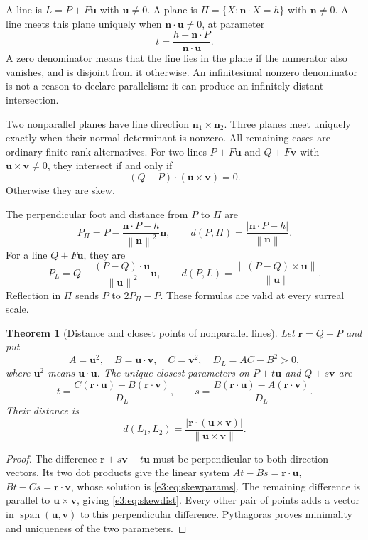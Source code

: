 \documentclass[11pt,letterpaper]{article}
\numberwithin{equation}{section}
\newtheorem{theorem}{Theorem}[section]
\theoremstyle{definition}
\theoremstyle{remark}
\newcommand{\Span}{\operatorname{span}}
\newcommand{\norm}[1]{\left\lVert#1\right\rVert}
\newcommand{\vv}[1]{\bm{#1}}
\begin{document}
A line is $L=P+F\vv u$ with $\vv u\ne0$. A plane is
$\Pi=\{X:\vv n\cdot X=h\}$ with $\vv n\ne0$.
A line meets this plane uniquely when $\vv n\cdot\vv u\ne0$, at parameter
\begin{equation}\label{e3:eq:lineplane}
 t=\frac{h-\vv n\cdot P}{\vv n\cdot\vv u}.
\end{equation}
A zero denominator means that the line lies in the plane if the numerator
also vanishes, and is disjoint from it otherwise. An infinitesimal nonzero
denominator is not a reason to declare parallelism: it can produce an
infinitely distant intersection.

Two nonparallel planes have line direction $\vv n_1\times\vv n_2$.
Three planes meet uniquely exactly when their normal determinant is nonzero.
All remaining cases are ordinary finite-rank alternatives. For two lines
$P+F\vv u$ and $Q+F\vv v$ with $\vv u\times\vv v\ne0$, they intersect
if and only if
\[
 (Q-P)\cdot(\vv u\times\vv v)=0.
\]
Otherwise they are skew.

The perpendicular foot and distance from $P$ to $\Pi$ are
\begin{equation}\label{e3:eq:pointplane}
 P_\Pi=P-\frac{\vv n\cdot P-h}{\norm{\vv n}^2}\vv n,
 \qquad d(P,\Pi)=\frac{|\vv n\cdot P-h|}{\norm{\vv n}}.
\end{equation}
For a line $Q+F\vv u$, they are
\[
 P_L=Q+\frac{(P-Q)\cdot\vv u}{\norm{\vv u}^2}\vv u,
 \qquad d(P,L)=\frac{\norm{(P-Q)\times\vv u}}{\norm{\vv u}}.
\]
Reflection in $\Pi$ sends $P$ to $2P_\Pi-P$. These formulas are valid at every
surreal scale.

\begin{theorem}[Distance and closest points of nonparallel lines]\label{e3:thm:skew}
Let $\vv r=Q-P$ and put
\[
 A=\vv u^2,\quad B=\vv u\cdot\vv v,\quad C=\vv v^2,
 \quad D_L=AC-B^2>0,
\]
where $\vv u^2$ means $\vv u\cdot\vv u$. The unique closest parameters on
$P+t\vv u$ and $Q+s\vv v$ are
\begin{equation}\label{e3:eq:skewparams}
 t=\frac{C(\vv r\cdot\vv u)-B(\vv r\cdot\vv v)}{D_L},\qquad
 s=\frac{B(\vv r\cdot\vv u)-A(\vv r\cdot\vv v)}{D_L}.
\end{equation}
Their distance is
\begin{equation}\label{e3:eq:skewdist}
 d(L_1,L_2)=\frac{|\vv r\cdot(\vv u\times\vv v)|}
 {\norm{\vv u\times\vv v}}.
\end{equation}
\end{theorem}
\begin{proof}
The difference $\vv r+s\vv v-t\vv u$ must be perpendicular to both direction
vectors. Its two dot products give the linear system
$At-Bs=\vv r\cdot\vv u$, $Bt-Cs=\vv r\cdot\vv v$, whose solution is
\cref{e3:eq:skewparams}. The remaining difference is parallel to
$\vv u\times\vv v$, giving \cref{e3:eq:skewdist}. Every other pair of points
adds a vector in $\Span(\vv u,\vv v)$ to this perpendicular difference.
Pythagoras proves minimality and uniqueness of the two parameters.
\end{proof}
\end{document}

